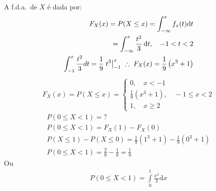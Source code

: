 \begin{description}
         A f.d.a.\ de $X$ é dada por: 
         \begin{align*}
           F_{X}(x)= P(X \le x)= \int_{-\infty}^{x} f_{x}(t) \mathrm{d}t\\
           = \int_{-\infty}^{x} \frac{t^2}{3} \, \mathrm{d}t , \quad -1<t<2 \\
           \int_{-1}^{x} \frac{t^2}{3} dt= \frac{1}{9} \left.t^3\right\rvert_{-1}^{x} \; \therefore \; F_{X}(x)= \frac{1}{9}\left(x^3 +1\right)
         \end{align*}
         \begin{align*}
           F_{X}(x)=P(X \le x)= 
           \begin{cases}
             0, \quad x <-1 \\
             \frac{1}{9}(x^3 +1) , \quad -1 \le x <2 \\
             1, \quad x \geq 2
           \end{cases}
         \end{align*}
         \begin{align*}
           P(0 \le X <1)=? \\
           P(0 \le X <1)= {F}_{X}(1)- {F}_{X}(0)\\
           P(X \le 1 ) - P(X \le 0)= \frac{1}{9} (1^3 + 1 ) - \frac{1}{9}(0^3+ 1)\\
           P(0 \le X < 1 )= \frac{2}{9} - \frac{1}{9} = \frac{1}{9}
         \end{align*}
         Ou 
         \begin{align*}
           P(0 \leq X < 1) = \int \limits_{0}^{1} \frac{x^2 }{3}\mathrm{d}x 
         \end{align*}
     \end{description}
